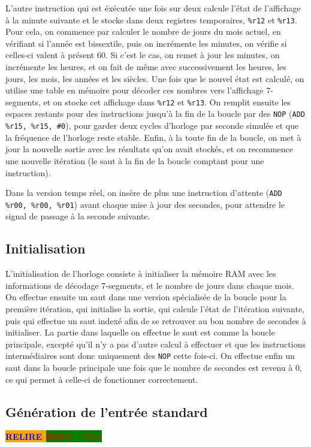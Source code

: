 \documentclass[11pt,a4paper]{article}
\newcommand{\acronym}[1]{\MakeUppercase{#1}}
\newcommand{\relire}{\colorbox{orange}{\textcolor{blue}{\textbf{RELIRE}~}}}
\newcommand{\relu}[1]{\colorbox{green}{\textcolor{red}{\textbf{RELU~:} #1}}}
\begin{document}
L'autre instruction qui est éxécutée une fois sur deux calcule l'état
de l'affichage à la minute suivante et le stocke dans deux registres
temporaires, \verb!%r12! et \verb!%r13!. Pour cela, on commence par
calculer le nombre de jours du mois actuel, en vérifiant si l'année
est bissextile, puis on incrémente les minutes, on vérifie si
celles-ci valent à présent 60. Si c'est le cas, on remet à jour les
minutes, on incrémente les heures, et on fait de même avec
successivement les heures, les jours, les mois, les années et les
siècles. Une fois que le nouvel état est calculé, on utilise une table
en mémoire pour décoder ces nombres vers l'affichage 7-segments, et on
stocke cet affichage dans \verb!%r12! et \verb!%r13!. On remplit
ensuite les espaces restants pour des instructions jusqu'à la fin de
la boucle par des \verb!NOP! (\verb!ADD %r15, %r15, #0!), pour garder
deux cycles d'horloge par seconde simulée et que la fréquence de
l'horloge reste stable. Enfin, à la toute fin de la boucle, on met à
jour la nouvelle sortie avec les résultats qu'on avait stockés, et on
recommence une nouvelle itération (le saut à la fin de la boucle
comptant pour une instruction).

Dans la version temps réel, on insère de plus une instruction
d'attente (\verb!ADD %r00, %r00, %r01!) avant chaque mise à jour des
secondes, pour attendre le signal de passage à la seconde suivante.

\subsection{Initialisation}

L'initialisation de l'horloge consiste à initialiser la mémoire
\acronym{ram} avec les informations de décodage 7-segments, et le
nombre de jours dans chaque mois. On effectue ensuite un saut dans une
version spécialisée de la boucle pour la première itération, qui
initialise la sortie, qui calcule l'état de l'itération suivante, puis
qui effectue un saut indexé afin de se retrouver au bon nombre de
secondes à initialiser. La partie dans laquelle on effectue le saut
est comme la boucle principale, excepté qu'il n'y a pas d'autre calcul
à effectuer et que les instructions intermédiaires sont donc
uniquement des \verb!NOP! cette fois-ci. On effectue enfin un saut
dans la boucle principale une fois que le nombre de secondes est
revenu à 0, ce qui permet à celle-ci de fonctionner correctement.

\subsection{Génération de l'entrée standard}
\relire  \relu{Théo}
\end{document}
